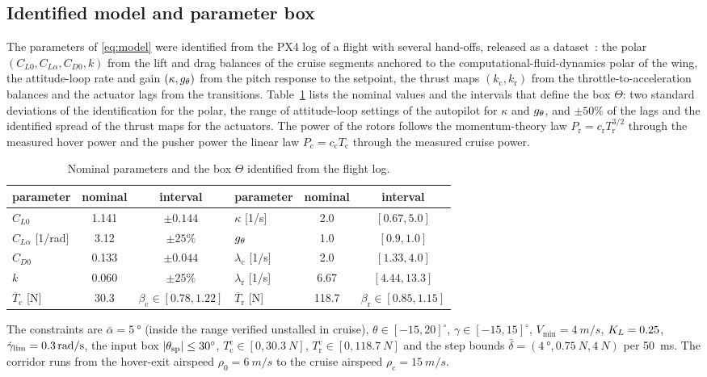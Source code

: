 \subsection{Identified model and parameter box}
The parameters of \eqref{eq:model} were identified from the PX4 log of a flight with several hand-offs, released as a dataset~\cite{Dony2026data}: the polar $(C_{L0},C_{L\alpha},C_{D0},k)$ from the lift and drag balances of the cruise segments anchored to the computational-fluid-dynamics polar of the wing, the attitude-loop rate and gain $(\kappa,g_\theta)$ from the pitch response to the setpoint, the thrust maps $(k_{\mathrm c},k_{\mathrm r})$ from the throttle-to-acceleration balances and the actuator lags from the transitions. Table~\ref{tab:box} lists the nominal values and the intervals that define the box $\Theta$: two standard deviations of the identification for the polar, the range of attitude-loop settings of the autopilot for $\kappa$ and $g_\theta$, and $\pm50\%$ of the lags and the identified spread of the thrust maps for the actuators. The power of the rotors follows the momentum-theory law $P_{\mathrm r}=c_{\mathrm r}T_{\mathrm r}^{3/2}$ through the measured hover power and the pusher power the linear law $P_{\mathrm c}=c_{\mathrm c}T_{\mathrm c}$ through the measured cruise power.
\begin{table}[t]\centering\footnotesize
\caption{Nominal parameters and the box $\Theta$ identified from the flight log.}\label{tab:box}
\setlength{\tabcolsep}{2.5pt}\scriptsize
\begin{tabular}{lcc|lcc}\toprule
parameter & nominal & interval & parameter & nominal & interval\\\midrule
$C_{L0}$ & 1.141 & $\pm0.144$ & $\kappa$ [1/s] & 2.0 & $[0.67,5.0]$\\
$C_{L\alpha}$ [1/rad] & 3.12 & $\pm25\%$ & $g_\theta$ & 1.0 & $[0.9,1.0]$\\
$C_{D0}$ & 0.133 & $\pm0.044$ & $\lambda_{\mathrm c}$ [1/s] & 2.0 & $[1.33,4.0]$\\
$k$ & 0.060 & $\pm25\%$ & $\lambda_{\mathrm r}$ [1/s] & 6.67 & $[4.44,13.3]$\\
$\overline T_{\mathrm c}$ [N] & 30.3 & $\beta_{\mathrm c}\in[0.78,1.22]$ & $\overline T_{\mathrm r}$ [N] & 118.7 & $\beta_{\mathrm r}\in[0.85,1.15]$\\
\bottomrule\end{tabular}\end{table}
The constraints are $\bar\alpha=\SI{5}{\degree}$ (inside the range verified unstalled in cruise), $\theta\in[-15,20]^\circ$, $\gamma\in[-15,15]^\circ$, $V_{\min}=\SI{4}{m/s}$, $K_L=0.25{}$, $\dot\gamma_{\lim}=\SI{0.3}{rad/s}$, the input box $|\theta_{\mathrm{sp}}|\le\SI{30}{\degree}$, $T^{\mathrm c}_{\mathrm c}\in[0,\SI{30.3}{N}]$, $T^{\mathrm c}_{\mathrm r}\in[0,\SI{118.7}{N}]$ and the step bounds $\bar\delta=(\SI{4}{\degree},\SI{0.75}{N},\SI{4}{N})$ per \SI{50}{ms}. The corridor runs from the hover-exit airspeed $\rho_0=\SI{6}{m/s}$ to the cruise airspeed $\rho_{\mathrm c}=\SI{15}{m/s}$.

